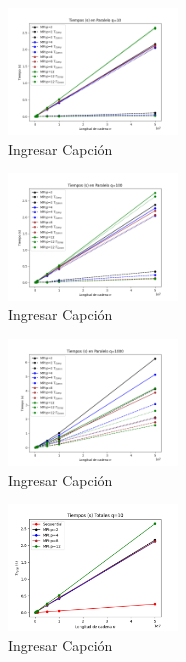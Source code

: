 \begin{figure}[H]
    \centerline{
        \includegraphics[width=0.4\textwidth]{graficos/tiempos_paralelo_q10.png}
    }
    \caption{Ingresar Capción}
    \label{grafico:tiempos_paralelo_q10}
\end{figure}
\begin{figure}[H]
    \centerline{
        \includegraphics[width=0.4\textwidth]{graficos/tiempos_paralelo_q100.png}
    }
    \caption{Ingresar Capción}
    \label{grafico:tiempos_paralelo_q100}
\end{figure}
\begin{figure}[H]
    \centerline{
        \includegraphics[width=0.4\textwidth]{graficos/tiempos_paralelo_q1000.png}
    }
    \caption{Ingresar Capción}
    \label{grafico:tiempos_paralelo_q1000}
\end{figure}
\begin{figure}[H]
    \centerline{
        \includegraphics[width=0.4\textwidth]{graficos/tiempos_totales_q10.png}
    }
    \caption{Ingresar Capción}
    \label{grafico:tiempos_totales_q10}
\end{figure}
